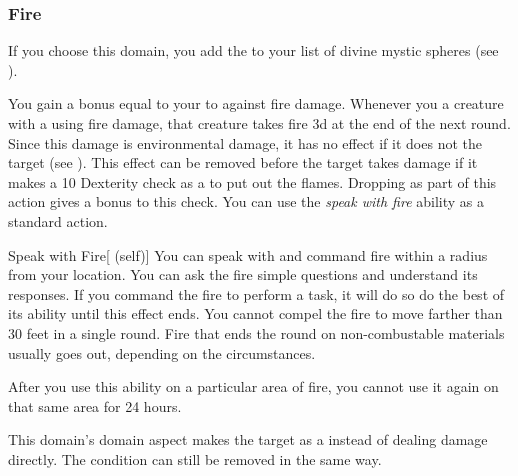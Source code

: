         \subsubsection{Fire}
            If you choose this domain, you add the   to your list of divine mystic spheres (see ).

             You gain a bonus equal to your  to  against fire damage.
             Whenever you  a creature with a  using fire damage, that creature takes  fire  \minus3d at the end of the next round.
            Since this damage is environmental damage, it has no effect if it does not  the target (see ).
            This effect can be removed before the target takes damage if it makes a  10 Dexterity check as a  to put out the flames.
            Dropping  as part of this action gives a  bonus to this check.
             You can use the \textit{speak with fire} ability as a standard action.
            \begin{attuneability}{Speak with Fire}[ (self)]
                You can speak with and command fire within a \areahuge radius  from your location.
                You can ask the fire simple questions and understand its responses.
                If you command the fire to perform a task, it will do so do the best of its ability until this effect ends.
                You cannot compel the fire to move farther than 30 feet in a single round.
                Fire that ends the round on non-combustable materials usually goes out, depending on the circumstances.

                After you use this ability on a particular area of fire, you cannot use it again on that same area for 24 hours.
            \end{attuneability}
             This domain's domain aspect makes the target  as a  instead of dealing damage directly.
            The condition can still be removed in the same way.

